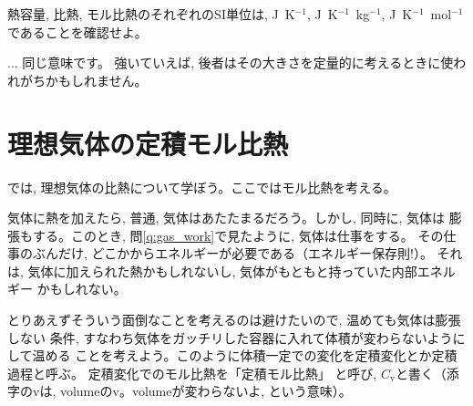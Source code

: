 \begin{q}\label{q:hinetsu}
熱容量, 比熱, モル比熱のそれぞれのSI単位は, 
J~K$^{-1}$, 
J~K$^{-1}$~kg$^{-1}$, 
J~K$^{-1}$~mol$^{-1}$であることを確認せよ。
\end{q}

\begin{faq}{\small{}... 同じ意味です。
強いていえば, 後者はその大きさを定量的に考えるときに使われがちかもしれません。}\end{faq}
\mv

\section{理想気体の定積モル比熱}

では, 理想気体の比熱について学ぼう。ここではモル比熱を考える。

気体に熱を加えたら, 普通, 気体はあたたまるだろう。しかし, 同時に, 気体は
膨張もする。このとき, 問\ref{q:gas_work}で見たように, 気体は仕事をする。
その仕事のぶんだけ, どこかからエネルギーが必要である（エネルギー保存則!）。
それは, 気体に加えられた熱かもしれないし, 気体がもともと持っていた内部エネルギー
かもしれない。

とりあえずそういう面倒なことを考えるのは避けたいので, 温めても気体は膨張しない
条件, すなわち気体をガッチリした容器に入れて体積が変わらないようにして温める
ことを考えよう。このように体積一定での変化を定積変化とか定積過程と呼ぶ。
定積変化でのモル比熱を「定積モル比熱」
と呼び, $C_{\text{v}}$と書く（添字のvは, volumeのv。volumeが変わらないよ, 
という意味）。

